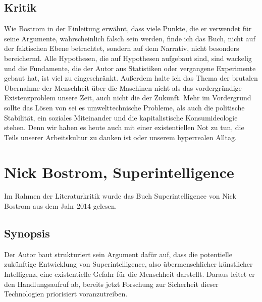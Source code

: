 \documentclass[twoside, a4paper, DIV=11, open=any, bibliography=totoc]{scrbook}
\newcommand{\Quote}[1]{\glqq #1\grqq{}}
\begin{document}
\subsection{Kritik} \label{sec:litkritik1}

Wie Bostrom in der Einleitung erwähnt, dass viele Punkte, die er verwendet für seine Argumente, wahrscheinlich falsch sein werden, finde ich das Buch, nicht auf der faktischen Ebene betrachtet, sondern auf dem Narrativ, nicht besonders bereichernd. Alle Hypothesen, die auf Hypothesen aufgebaut sind, sind wackelig und die Fundamente, die der Autor aus Statistiken oder vergangene Experimente gebaut hat, ist viel zu eingeschränkt. Außerdem halte ich das Thema der brutalen Übernahme der Menschheit über die Maschinen nicht als das vordergründige Existenzproblem unsere Zeit, auch nicht die der Zukunft. Mehr im Vordergrund sollte das Lösen von sei es umwelttechnische Probleme, als auch die politische Stabilität, ein soziales Miteinander und die kapitalistische Konsumideologie stehen. Denn wir haben es heute auch mit einer existentiellen Not zu tun, die Teils unserer Arbeitskultur zu danken ist oder unserem hyperrealen Alltag. 



\section{Nick Bostrom, Superintelligence} \label{sec:litb}

Im Rahmen der Literaturkritik wurde das Buch Superintelligence von Nick Bostrom
aus dem Jahr 2014 gelesen.

\subsection{Synopsis} \label{sec:litsynops}

Der Autor baut strukturiert sein Argument dafür auf, dass die potentielle zukünftige
Entwicklung von \Quote{Superintelligence}, also übermenschlicher künstlicher Intelligenz,
eine existentielle Gefahr für die Menschheit darstellt. Daraus leitet er den
Handlungsaufruf ab, bereits jetzt Forschung zur Sicherheit dieser Technologien
priorisiert voranzutreiben.
\end{document}
